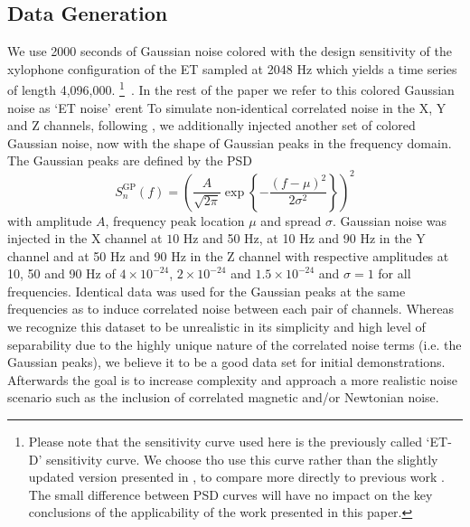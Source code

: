 \documentclass[%
 reprint,
 amsmath,amssymb,
 aps,
]{revtex4-2}
\begin{document}
\subsection{Data Generation}
We use 2000 seconds of  
Gaussian noise colored with the design sensitivity of the
xylophone configuration of the ET sampled at 2048 Hz which yields a time series of length 4,096,000.  \footnote{Please note that the sensitivity curve used here is the previously called `ET-D' sensitivity curve. We choose tho use this curve rather than the slightly updated version presented in \cite{Branchesi:2023mws}, to compare more directly to previous work \cite{Janssens2023}. The small difference between PSD curves will have no impact on the key conclusions of the applicability of the work presented in this paper.}~\cite{Hild_2009,Hild:2010id}. In the rest of the
paper we refer to this colored Gaussian noise as `ET noise' %
erent
To simulate  non-identical correlated noise in the X, Y and Z channels, following \cite{Janssens2023}, we additionally injected another set of colored Gaussian noise, now with the shape of Gaussian peaks in the frequency domain. The Gaussian peaks are defined by the PSD
\[ S_n^{\mathrm{GP}}(f)= \left( \frac{A}{\sqrt{2\pi}}\exp\left\{ 
- \frac{(f-\mu)^2}{2\sigma^2}\right\}\right)^2\]
with amplitude $A$, frequency peak location $\mu$ and spread $\sigma$.
Gaussian noise was
injected in the X channel at $10$ Hz and 50 Hz, at 10
Hz and 90 Hz in the Y channel and at 50 Hz and 90 Hz in the Z channel with respective amplitudes at 10, 50 and 90 Hz of $4\times 10^{-24}$, $2\times 10^{-24}$ and $1.5\times 10^{-24}$ and $\sigma=1$ for all frequencies. Identical data was used for the Gaussian peaks at the same frequencies as to induce correlated noise between each pair of channels.
Whereas we recognize this dataset to be unrealistic in its simplicity and high level of separability due to the highly unique nature of the correlated noise terms (i.e. the Gaussian peaks), we believe it to be a good data set for initial demonstrations. Afterwards the goal is to increase complexity and approach a more realistic noise scenario such as the inclusion of correlated magnetic and/or Newtonian noise.
\end{document}
